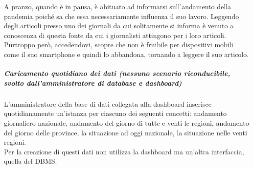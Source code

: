 A pranzo, quando è in pausa, è abituato ad informarsi sull'andamento della pandemia poiché sa che essa necessariamente influenza il suo lavoro.
Leggendo degli articoli presso uno dei giornali da cui solitamente si informa è venuto a conoscenza di questa fonte da cui i giornalisti attingono per i loro articoli.\\
Purtroppo però, accedendovi, scopre che non è fruibile per dispositivi mobili come il suo smartphone e quindi lo abbandona, tornando a leggere il suo articolo.
\noindent
\subparagraph{Caricamento quotidiano dei dati (nessuno scenario riconducibile, svolto dall'amministratore di database e dashboard)}
L'amministratore della base di dati collegata alla dashboard inserisce quotidianamente un'istanza per ciascuno dei seguenti concetti: andamento giornaliero nazionale, andamento del giorno di tutte e venti le regioni, andamento del giorno delle province, la situazione ad oggi nazionale, la situazione nelle venti regioni.\\
Per la creazione di questi dati non utilizza la dashboard ma un'altra interfaccia, quella del DBMS.